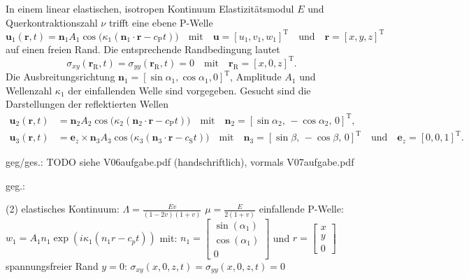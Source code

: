 

In einem linear elastischen, isotropen Kontinuum Elastizitätsmodul $E$ und Querkontraktionszahl $\nu$ trifft eine ebene P-Welle
\begin{equation*}
    \mathbf{u}_1(\mathbf{r},t)=\mathbf{n}_1 A_1 \cos\bigl(\kappa_1 (\mathbf{n}_1\cdot \mathbf{r}-c_\mathrm{P}t)\bigr) 
    \quad \text{mit} \quad
    \mathbf{u}=[u_1,v_1,w_1]^\mathrm{T}
    \quad \text{und} \quad
    \mathbf{r}=[x,y,z]^\mathrm{T}
\end{equation*}
auf einen freien Rand. Die entsprechende Randbedingung lautet
\begin{equation*}
    \sigma_{xy}(\mathbf{r}_\mathrm{R},t) = \sigma_{yy}(\mathbf{r}_\mathrm{R},t) = 0
    \quad \text{mit} \quad
    \mathbf{r}_\mathrm{R}=[x,0,z]^\mathrm{T}. 
\end{equation*}
Die Ausbreitungsrichtung $\mathbf{n}_1=[\sin\alpha_1, \cos\alpha_1, 0]^\mathrm{T}$, Amplitude $A_1$ und Wellenzahl $\kappa_1$ der einfallenden Welle sind vorgegeben.
Gesucht sind die Darstellungen der reflektierten Wellen
\begin{align*}
    \mathbf{u}_2(\mathbf{r},t) &= \mathbf{n}_2 A_2 \cos\bigl(\kappa_2 (\mathbf{n}_2\cdot \mathbf{r}-c_\mathrm{P}t)\bigr)
    \quad \text{mit} \quad
    \mathbf{n}_2=[\sin\alpha_2,\, -\cos\alpha_2,\, 0]^\mathrm{T}, \\
    \mathbf{u}_3(\mathbf{r},t) &= \mathbf{e}_z\times\mathbf{n}_3 A_3 \cos\bigl(\kappa_3 (\mathbf{n}_3\cdot \mathbf{r}-c_\mathrm{S}t)\bigr)
    \quad \text{mit} \quad 
    \mathbf{n}_3=[\sin\beta,\, -\cos\beta,\, 0]^\mathrm{T}
    \quad \text{und} \quad
    \mathbf{e}_z=[0,0,1]^\mathrm{T}.
\end{align*}

 geg/ges.: TODO siehe V06aufgabe.pdf (handschriftlich), vormals V07aufgabe.pdf

\begin{minipage}[t]{\textwidth}
    geg.:
    \begin{tasks} (2)
        \task[] elastisches Kontinuum:
        \task[] %
        \task[] $\Lambda = \frac{E v}{(1-2v)(1+v)}$
        \task[] $\mu = \frac{E}{2(1+v)}$
        \task[] einfallende P-Welle:
        \task[] %
        \task[] $w_1 = A_1 n_1 \exp(i \kappa_1(n_1 r-c_p t))$ 
        \task[] mit: $n_1 = 
                \begin{bmatrix}
                    \sin(\alpha_1) \\
                    \cos(\alpha_1) \\
                    0
                \end{bmatrix}$ und $r = \begin{bmatrix}
                    x \\ y \\ 0
                \end{bmatrix}$
        \task[] spannungsfreier Rand $y = 0$:
        \task[] %
        \task[] $\sigma_{xy} (x,0,z,t) = \sigma_{yy} (x,0,z,t) = 0$
    \end{tasks}
\end{minipage}

